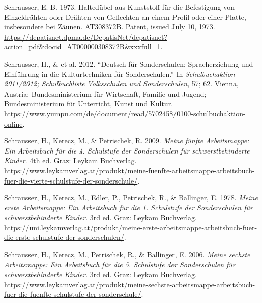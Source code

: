 \documentclass[
]{article}
\author{Dietmar Gerald SCHRAUSSER}
\date{14.04.2026}
\newlength{\cslhangindent}
\newlength{\cslentryspacingunit} %
\newenvironment{CSLReferences}[2] %
 {%
  \setlength{\parindent}{0pt}
  \ifodd #1
  \let\oldpar\par
  \def\par{\hangindent=\cslhangindent\oldpar}
  \fi
  \setlength{\parskip}{#2\cslentryspacingunit}
 }%
 {}
\begin{document}
\hypertarget{refs}{}
\begin{CSLReferences}{1}{0}
\leavevmode{}%
Schrausser, E. B. 1973. {Haltedübel aus Kunststoff für die Befestigung
von Einzeldrähten oder Drähten von Geflechten an einem Profil oder einer
Platte, insbesondere bei Zäunen}. AT308372B. Patent, issued July 10,
1973.
\url{https://depatisnet.dpma.de/DepatisNet/depatisnet?action=pdf\&docid=AT000000308372B\&xxxfull=1}.

\leavevmode{}%
Schrausser, H., \& et al. 2012. {``{Deutsch für Sonderschulen;
Spracherziehung und Einführung in die Kulturtechniken für
Sonderschulen}.''} In \emph{{Schulbuchaktion 2011/2012; Schulbuchliste
Volksschulen und Sonderschulen}}, 57; 62. {Vienna, Austria}:
{Bundesministerium für Wirtschaft, Familie und Jugend; Bundesministerium
für Unterricht, Kunst und Kultur}.
\url{https://www.yumpu.com/de/document/read/5702458/0100-schulbuchaktion-online}.

\leavevmode{}%
Schrausser, H., Kerecz, M., \& Petrischek, R. 2009. \emph{{Meine fünfte
Arbeitsmappe}: {Ein Arbeitsbuch für die 4. Schulstufe der Sonderschulen
für schwerstbehinderte Kinder}}. 4th ed. Graz: Leykam Buchverlag.
\url{https://www.leykamverlag.at/produkt/meine-fuenfte-arbeitsmappe-arbeitsbuch-fuer-die-vierte-schulstufe-der-sonderschule/}.

\leavevmode{}%
Schrausser, H., Kerecz, M., Edler, P., Petrischek, R., \& Ballinger, E.
1978. \emph{{Meine erste Arbeitsmappe}: {Ein Arbeitsbuch für die 1.
Schulstufe der Sonderschulen für schwerstbehinderte Kinder}}. 3rd ed.
Graz: Leykam Buchverlag.
\url{https://uni.leykamverlag.at/produkt/meine-erste-arbeitsmappe-arbeitsbuch-fuer-die-erste-schulstufe-der-sonderschulen/}.

\leavevmode{}%
Schrausser, H., Kerecz, M., Petrischek, R., \& Ballinger, E. 2006.
\emph{{Meine sechste Arbeitsmappe}: {Ein Arbeitsbuch für die 5.
Schulstufe der Sonderschulen für schwerstbehinderte Kinder}}. 3rd ed.
Graz: Leykam Buchverlag.
\url{https://www.leykamverlag.at/produkt/meine-sechste-arbeitsmappe-arbeitsbuch-fuer-die-fuenfte-schulstufe-der-sonderschule/}.

\end{CSLReferences}
\end{document}
